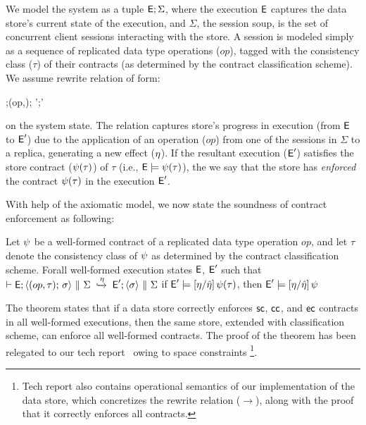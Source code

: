 We model the system as a tuple ${\normalfont \textsf{E}};\Sigma$, where the execution ${\normalfont \textsf{E}}$
captures the data store's current state of the execution, and
$\Sigma$, the session soup, is the set of concurrent client sessions
interacting with the store. A session is modeled simply as a sequence
of replicated data type operations ($op$), tagged with the consistency
class ($\tau$) of their contracts (as determined by the contract
classification scheme). We assume rewrite relation of form:

\vspace{-1.7em}
\begin{smathpar}
  \auxred{} {\E;\langle (op,\tau);\sigma \rangle \pll \Sigma} {\eff} 
    {\E';\langle \sigma \rangle \pll \Sigma'}
\end{smathpar}

\noindent on the system state. The relation captures store's progress
in execution (from ${\normalfont \textsf{E}}$ to ${\normalfont \textsf{E}}'$) due to the application of an
operation ($op$) from one of the sessions in $\Sigma$ to a replica,
generating a new effect ($\eta$). If the resultant execution (${\normalfont \textsf{E}}'$)
satisfies the store contract ($\psi(\tau)$) of $\tau$ (i.e., ${\normalfont \textsf{E}}
\models \psi(\tau)$), the we say that the store has \emph{enforced} the
contract $\psi(\tau)$ in the execution ${\normalfont \textsf{E}}'$.

With help of the axiomatic model, we now state the soundness of
contract enforcement as following:

\begin{theorem}
\label{lem:core-preservation}
Let $\psi$ be a well-formed contract of a replicated data type operation $op$,
and let $\tau$ denote the consistency class of $\psi$ as determined by
the contract classification scheme. Forall well-formed execution
states ${\normalfont \textsf{E}}$, ${\normalfont \textsf{E}}'$ such that
$\vdash {\normalfont \textsf{E}};\langle (op,\tau);\,\sigma \rangle ~\|~ \Sigma \;\xhookrightarrow{\eta}\; {\normalfont \textsf{E}}';\langle \sigma \rangle ~\|~ \Sigma$
if ${\normalfont \textsf{E}}' \models [\eta/\hat{\eta}]\,\psi(\tau)$, then ${\normalfont \textsf{E}}' \models [\eta/\hat{\eta}]\,\psi$
\end{theorem}

The theorem states that if a data store correctly enforces ${\sf sc}$,
${\sf cc}$, and ${\sf ec}$ contracts in all well-formed executions, then the
same store, extended with classification scheme, can enforce all
well-formed \name contracts. The proof of the theorem has been
relegated to our tech report~\cite{techrep} owing to space
constraints \footnote{Tech report also contains operational semantics of our
implementation of the data store, which concretizes the rewrite
relation ($\xrightarrow{}$), along with the proof that it correctly
enforces all \name contracts.}.


